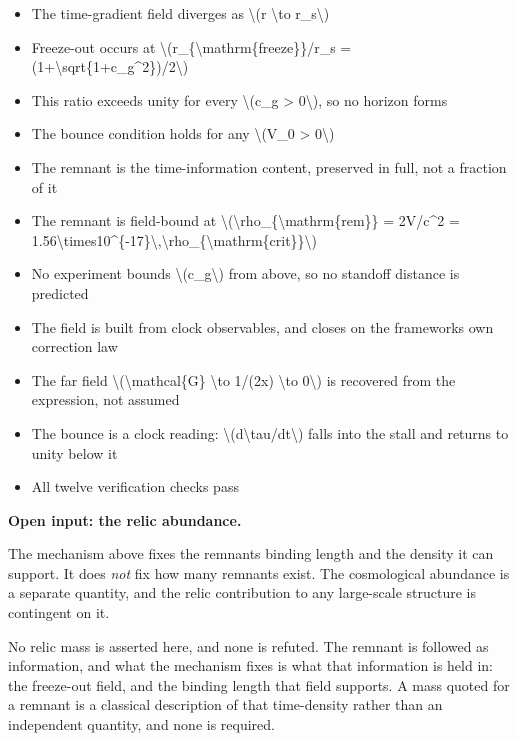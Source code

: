 \documentclass[
  10pt,
]{article}
\providecommand{\tightlist}{%
  \setlength{\itemsep}{0pt}\setlength{\parskip}{0pt}}
\begin{document}
\begin{itemize}
\tightlist
\item
  The time-gradient field diverges as \textbackslash(r \textbackslash to
  r\_s\textbackslash)
\item
  Freeze-out occurs at
  \textbackslash(r\_\{\textbackslash mathrm\{freeze\}\}/r\_s =
  (1+\textbackslash sqrt\{1+c\_g\^{}2\})/2\textbackslash)
\item
  This ratio exceeds unity for every \textbackslash(c\_g \textgreater{}
  0\textbackslash), so no horizon forms
\item
  The bounce condition holds for any \textbackslash(V\_0 \textgreater{}
  0\textbackslash)
\item
  The remnant is the time-information content, preserved in full, not a
  fraction of it
\item
  The remnant is field-bound at
  \textbackslash(\textbackslash rho\_\{\textbackslash mathrm\{rem\}\} =
  2V/c\^{}2 =
  1.56\textbackslash times10\^{}\{-17\}\textbackslash,\textbackslash rho\_\{\textbackslash mathrm\{crit\}\}\textbackslash)
\item
  No experiment bounds \textbackslash(c\_g\textbackslash) from above, so
  no standoff distance is predicted
\item
  The field is built from clock observables, and closes on the
  framework\textquotesingle s own correction law
\item
  The far field \textbackslash(\textbackslash mathcal\{G\}
  \textbackslash to 1/(2x) \textbackslash to 0\textbackslash) is
  recovered from the expression, not assumed
\item
  The bounce is a clock reading:
  \textbackslash(d\textbackslash tau/dt\textbackslash) falls into the
  stall and returns to unity below it
\item
  All twelve verification checks pass
\end{itemize}

\textbf{Open input: the relic abundance.}

The mechanism above fixes the remnant\textquotesingle s binding length
and the density it can support. It does \emph{not} fix how many remnants
exist. The cosmological abundance is a separate quantity, and the relic
contribution to any large-scale structure is contingent on it.

No relic mass is asserted here, and none is refuted. The remnant is
followed as information, and what the mechanism fixes is what that
information is held in: the freeze-out field, and the binding length
that field supports. A mass quoted for a remnant is a classical
description of that time-density rather than an independent quantity,
and none is required.
\end{document}
